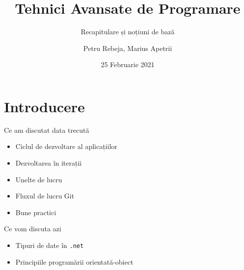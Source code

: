 \documentclass[presentation]{beamer}
\author{Petru Rebeja, Marius Apetrii}
\date{25 Februarie 2021}
\title{Tehnici Avansate de Programare}
\subtitle{Recapitulare și noțiuni de bază}
\institute[UAIC]{Facultatea de Matematică\\Universitatea Alexandru Ioan Cuza, Iași}
\begin{document}
\maketitle
\section{Introducere}
\label{sec:orgdc78b31}
\begin{frame}[label={sec:orga7ba789}]{Ce am discutat data trecută}
\pause
\begin{itemize}
\item Ciclul de dezvoltare al aplicațiilor
\item Dezvoltarea în iterații
\item Unelte de lucru
\item Fluxul de lucru Git
\item Bune practici
\end{itemize}
\end{frame}
\begin{frame}[label={sec:org364043d},fragile]{Ce vom discuta azi}
 \begin{itemize}
\item Tipuri de date în \texttt{.net}
\item Principiile programării orientată-obiect
\end{itemize}
\end{frame}
\end{document}
